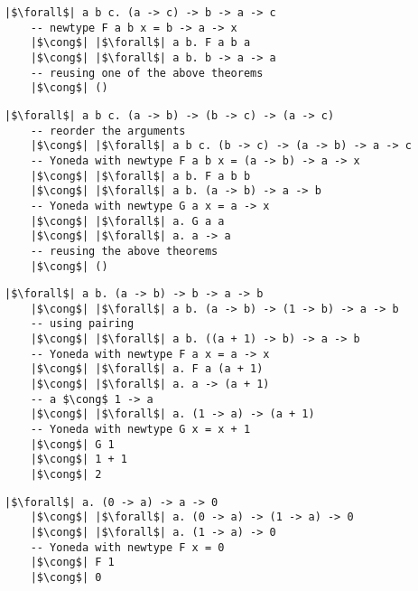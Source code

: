 \documentclass[tikz]{beamer}
\theoremstyle{definition}
\begin{document}
\begin{frame}[fragile]
\begin{verbatim}
|$\forall$| a b c. (a -> c) -> b -> a -> c
    -- newtype F a b x = b -> a -> x
    |$\cong$| |$\forall$| a b. F a b a
    |$\cong$| |$\forall$| a b. b -> a -> a
    -- reusing one of the above theorems
    |$\cong$| ()
\end{verbatim}
\end{frame}

\begin{frame}[fragile]
\begin{verbatim}
|$\forall$| a b c. (a -> b) -> (b -> c) -> (a -> c)
    -- reorder the arguments
    |$\cong$| |$\forall$| a b c. (b -> c) -> (a -> b) -> a -> c
    -- Yoneda with newtype F a b x = (a -> b) -> a -> x
    |$\cong$| |$\forall$| a b. F a b b
    |$\cong$| |$\forall$| a b. (a -> b) -> a -> b
    -- Yoneda with newtype G a x = a -> x
    |$\cong$| |$\forall$| a. G a a
    |$\cong$| |$\forall$| a. a -> a
    -- reusing the above theorems
    |$\cong$| ()
\end{verbatim}
\end{frame}

\begin{frame}[fragile]
\begin{verbatim}
|$\forall$| a b. (a -> b) -> b -> a -> b
    |$\cong$| |$\forall$| a b. (a -> b) -> (1 -> b) -> a -> b
    -- using pairing
    |$\cong$| |$\forall$| a b. ((a + 1) -> b) -> a -> b
    -- Yoneda with newtype F a x = a -> x
    |$\cong$| |$\forall$| a. F a (a + 1)
    |$\cong$| |$\forall$| a. a -> (a + 1)
    -- a $\cong$ 1 -> a
    |$\cong$| |$\forall$| a. (1 -> a) -> (a + 1)
    -- Yoneda with newtype G x = x + 1
    |$\cong$| G 1
    |$\cong$| 1 + 1
    |$\cong$| 2
\end{verbatim}
\end{frame}

\begin{frame}[fragile]
\begin{verbatim}
|$\forall$| a. (0 -> a) -> a -> 0
    |$\cong$| |$\forall$| a. (0 -> a) -> (1 -> a) -> 0
    |$\cong$| |$\forall$| a. (1 -> a) -> 0
    -- Yoneda with newtype F x = 0
    |$\cong$| F 1
    |$\cong$| 0
\end{verbatim}
\end{frame}
\end{document}
